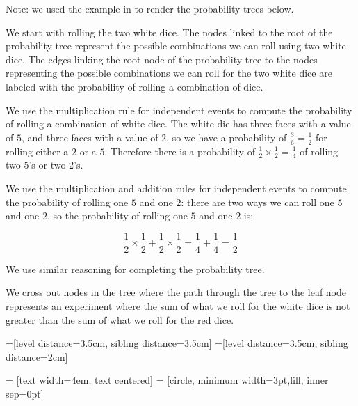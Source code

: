 \documentclass[a4paper,11pt]{article}
\begin{document}
Note: we used the example in \cite{probTreeHowTo} to render the
probability trees below.

We start with rolling the two white dice.  The nodes linked to the root
of the probability tree represent the possible combinations
we can roll using two white dice.  The edges linking the root node
of the probability tree to the nodes representing the possible
combinations we can roll for the two white dice are labeled with the
probability of rolling a combination of dice.  

We use the multiplication rule for independent events to compute the 
probability of rolling a combination of white dice. The white die has
three faces with a value of $5$, and three faces with a value of $2$,
so we have a probability of $\frac{3}{6} = \frac{1}{2}$ for rolling 
either a $2$ or a $5$.  Therefore there is a probability of
$\frac{1}{2}\times\frac{1}{2} = \frac{1}{4}$ of rolling two $5$'s or
two $2$'s.

We use the multiplication and addition rules for independent events
to compute the probability of rolling one $5$ and one $2$: there are
two ways we can roll one $5$ and one $2$, so the probability
of rolling one $5$ and one $2$ is:

\begin{equation}
\frac{1}{2} \times \frac{1}{2} + \frac{1}{2} \times \frac{1}{2}
=\frac{1}{4} + \frac{1}{4} = \frac{1}{2}
\end{equation}

We use similar reasoning for completing the probability tree.

We cross out nodes in the tree where the path through the tree
to the leaf node represents an experiment where the sum of what
we roll for the white dice is not greater than the sum of what we
roll for the red dice.

=[level distance=3.5cm, sibling distance=3.5cm]
=[level distance=3.5cm, sibling distance=2cm]

 = [text width=4em, text centered]
 = [circle, minimum width=3pt,fill, inner sep=0pt]
\end{document}
